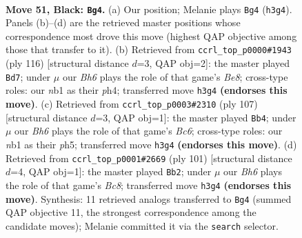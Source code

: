 \documentclass[11pt]{article}
\begin{document}
\clearpage

\begin{figure}[p]\centering
\begin{subfigure}{0.46\textwidth}\centering
\resizebox{\linewidth}{!}{%
\newchessgame
\chessboard[
  setfen={3B4/6k1/p7/8/2p5/7b/5K2/1N6 b - - 1 51},
  showmover=false,
  pgfstyle=straightmove, color=movearrow, markmove={h3-g4}
]}
\caption{}
\end{subfigure}\hfill
\begin{subfigure}{0.46\textwidth}\centering
\resizebox{\linewidth}{!}{%
\newchessgame
\chessboard[
  setfen={1b2B3/6k1/P7/8/4K2p/7P/8/8 w - - 3 59},
  showmover=false,
  pgfstyle=straightmove, color=movearrow, markmove={e8-d7}
]}
\caption{}
\end{subfigure}
\\[4pt]
\begin{subfigure}{0.46\textwidth}\centering
\resizebox{\linewidth}{!}{%
\newchessgame
\chessboard[
  setfen={3k4/1B6/3p3p/7P/8/2b5/4K3/8 b - - 2 54},
  showmover=false,
  pgfstyle=straightmove, color=movearrow, markmove={c3-b4}
]}
\caption{}
\end{subfigure}\hfill
\begin{subfigure}{0.46\textwidth}\centering
\resizebox{\linewidth}{!}{%
\newchessgame
\chessboard[
  setfen={8/3k4/8/8/p2P2K1/8/B7/2b5 b - - 0 51},
  showmover=false,
  pgfstyle=straightmove, color=movearrow, markmove={c1-b2}
]}
\caption{}
\end{subfigure}
\caption{\textbf{Move 51, Black: \texttt{Bg4}.} (a) Our position; Melanie plays \texttt{Bg4} (\texttt{h3g4}). Panels (b)--(d) are the retrieved master positions whose correspondence most drove this move (highest QAP objective among those that transfer to it). (b) Retrieved from \texttt{ccrl\_top\_p0000\#1943} (ply 116) [structural distance $d$=3, QAP obj=2]: the master played \texttt{Bd7}; under $\mu$ our \emph{Bh6} plays the role of that game's \emph{Be8}; cross-type roles: our \emph{n}b1 as their \emph{p}h4; transferred move \texttt{h3g4} \textbf{(endorses this move)}. (c) Retrieved from \texttt{ccrl\_top\_p0003\#2310} (ply 107) [structural distance $d$=3, QAP obj=1]: the master played \texttt{Bb4}; under $\mu$ our \emph{Bh6} plays the role of that game's \emph{Bc6}; cross-type roles: our \emph{n}b1 as their \emph{p}h5; transferred move \texttt{h3g4} \textbf{(endorses this move)}. (d) Retrieved from \texttt{ccrl\_top\_p0001\#2669} (ply 101) [structural distance $d$=4, QAP obj=1]: the master played \texttt{Bb2}; under $\mu$ our \emph{Bh6} plays the role of that game's \emph{Bc8}; transferred move \texttt{h3g4} \textbf{(endorses this move)}. Synthesis: 11 retrieved analogs transferred to \texttt{Bg4} (summed QAP objective 11, the strongest correspondence among the candidate moves); Melanie committed it via the \texttt{search} selector.}
\label{fig:thought-m101}
\end{figure}
\end{document}
